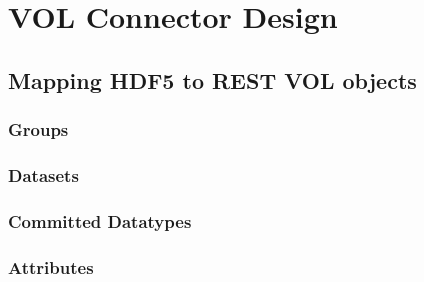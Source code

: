 \documentclass[../design_doc.tex]{subfiles}
\begin{document}
\section{VOL Connector Design}

\subsection{Mapping HDF5 to REST VOL objects}

\newpage

\subsubsection{Groups}

\newpage

\subsubsection{Datasets}

\newpage

\subsubsection{Committed Datatypes}

\newpage

\subsubsection{Attributes}

\newpage
\end{document}
